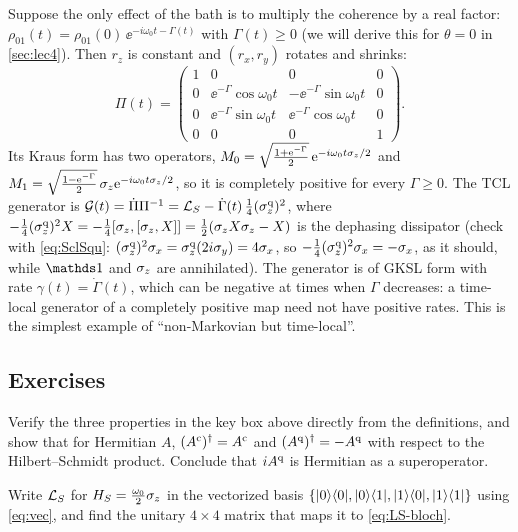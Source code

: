 \begin{exbox}
Suppose the only effect of the bath is to multiply the coherence by a real factor: $\rho_{01}(t)=\rho_{01}(0)\,\ee^{-i\omega_0t-\Gamma(t)}$ with $\Gamma(t)\ge0$ (we will derive this for $\theta=0$ in \cref{sec:lec4}).
Then $r_z$ is constant and $(r_x,r_y)$ rotates and shrinks:
\begin{equation}
  \Pi(t)=\begin{pmatrix}1&0&0&0\\ 0&\ee^{-\Gamma}\cos\omega_0t&-\ee^{-\Gamma}\sin\omega_0t&0\\
  0&\ee^{-\Gamma}\sin\omega_0t&\ee^{-\Gamma}\cos\omega_0t&0\\ 0&0&0&1\end{pmatrix}.
\end{equation}
Its Kraus form has two operators, $M_0=\sqrt{\tfrac{1+\mathrm{e}^{-\Gamma}}2}\,\mathrm{e}^{-i\omega_0t\sigma_z/2}$ and $M_1=\sqrt{\tfrac{1-\mathrm{e}^{-\Gamma}}2}\,\sigma_z\mathrm{e}^{-i\omega_0t\sigma_z/2}$, so it is completely positive for every $\Gamma\ge0$.
The TCL generator is $\mathcal{G}(t)=\dot\Pi\Pi^{-1}=\mathcal{L}_S-\dot\Gamma(t)\,\tfrac14(\sigma_z^{\mathrm{q}})^2$, where $-\tfrac14(\sigma_z^{\mathrm{q}})^2X=-\tfrac14[\sigma_z,[\sigma_z,X]]=\tfrac12(\sigma_z X\sigma_z-X)$ is the dephasing dissipator (check with \cref{eq:SclSqu}: $(\sigma_z^{\mathrm{q}})^2\sigma_x=\sigma_z^{\mathrm{q}}(2i\sigma_y)=4\sigma_x$, so $-\tfrac14(\sigma_z^{\mathrm{q}})^2\sigma_x=-\sigma_x$, as it should, while $\Id$ and $\sigma_z$ are annihilated).
The generator is of GKSL form with rate $\gamma(t)=\dot\Gamma(t)$, which can be negative at times when $\Gamma$ decreases: a time-local generator of a completely positive map need not have positive rates.
This is the simplest example of ``non-Markovian but time-local''.
\end{exbox}

\subsection{Exercises}

\begin{exercise}\label{ex:1-1}
Verify the three properties in the key box above directly from the definitions, and show that for Hermitian $A$, $(A^{\mathrm{c}})^\dagger=A^{\mathrm{c}}$ and $(A^{\mathrm{q}})^\dagger=-A^{\mathrm{q}}$ with respect to the Hilbert--Schmidt product.
Conclude that $i A^{\mathrm{q}}$ is Hermitian as a superoperator.
\end{exercise}

\begin{exercise}\label{ex:1-2}
Write $\mathcal{L}_S$ for $H_S=\frac{\omega_0}{2}\sigma_z$ in the vectorized basis $\{|0\rangle\langle0|,|0\rangle\langle1|,|1\rangle\langle0|,|1\rangle\langle1|\}$ using \cref{eq:vec}, and find the unitary $4\times4$ matrix that maps it to \cref{eq:LS-bloch}.
\end{exercise}

